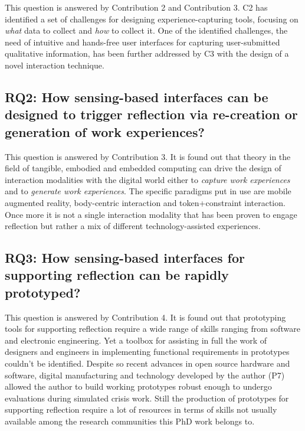 This question is answered by Contribution 2 and Contribution 3. C2 has
identified a set of challenges for designing experience-capturing tools,
focusing on \emph{what} data to collect and \emph{how} to collect it.
One of the identified challenges, the need of intuitive and hands-free
user interfaces for capturing user-submitted qualitative information,
has been further addressed by C3 with the design of a novel interaction
technique.

\subsection{RQ2: How sensing-based interfaces can be designed to trigger
reflection via re-creation or generation of work
experiences?}\label{rq2-how-sensing-based-interfaces-can-be-designed-to-trigger-reflection-via-re-creation-or-generation-of-work-experiences}

This question is answered by Contribution 3. It is found out that theory
in the field of tangible, embodied and embedded computing can drive the
design of interaction modalities with the digital world either to
\emph{capture work experiences} and to \emph{generate work experiences}.
The specific paradigms put in use are mobile augmented reality,
body-centric interaction and token+constraint interaction. Once more it
is not a single interaction modality that has been proven to engage
reflection but rather a mix of different technology-assisted
experiences.

\subsection{RQ3: How sensing-based interfaces for supporting reflection
can be rapidly
prototyped?}\label{rq3-how-sensing-based-interfaces-for-supporting-reflection-can-be-rapidly-prototyped}

This question is answered by Contribution 4. It is found out that
prototyping tools for supporting reflection require a wide range of
skills ranging from software and electronic engineering. Yet a toolbox
for assisting in full the work of designers and engineers in
implementing functional requirements in prototypes couldn't be
identified. Despite so recent advances in open source hardware and
software, digital manufacturing and technology developed by the author
(P7) allowed the author to build working prototypes robust enough to
undergo evaluations during simulated crisis work. Still the production
of prototypes for supporting reflection require a lot of resources in
terms of skills not usually available among the research communities
this PhD work belongs to.

